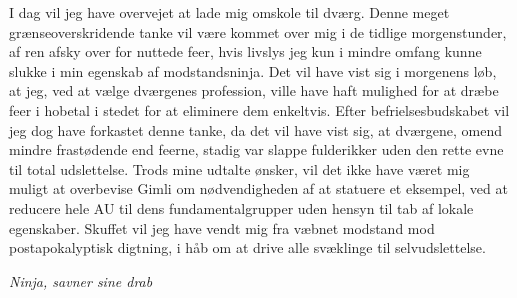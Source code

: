 \begin{minipage}[t]{100mm}
I dag vil jeg have overvejet at lade mig omskole til dværg. Denne meget grænseoverskridende tanke vil være kommet over mig i de tidlige morgenstunder, af ren afsky over for nuttede feer, hvis livslys jeg kun i mindre omfang kunne slukke i min egenskab af modstandsninja. Det vil have vist sig i morgenens løb, at jeg, ved at vælge dværgenes profession, ville have haft mulighed for at dræbe feer i hobetal i stedet for at eliminere dem enkeltvis. Efter befrielsesbudskabet vil jeg dog have forkastet denne tanke, da det vil have vist sig, at dværgene, omend mindre frastødende end feerne, stadig var slappe fulderikker uden den rette evne til total udslettelse. Trods mine udtalte ønsker, vil det ikke have været mig muligt at overbevise Gimli om nødvendigheden af at statuere et eksempel, ved at reducere hele AU til dens fundamentalgrupper uden hensyn til tab af lokale egenskaber. Skuffet vil jeg have vendt mig fra væbnet modstand mod postapokalyptisk digtning, i håb om at drive alle svæklinge til selvudslettelse.

{\flushright\emph{Ninja, savner sine drab}}


\end{minipage}

